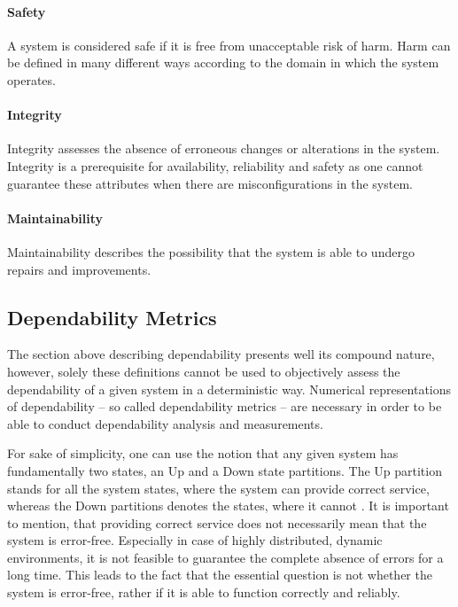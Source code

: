 \paragraph{Safety} A system is considered safe if it is free from unacceptable risk of harm. Harm can be defined in many different ways according to the domain in which the system operates.

\paragraph{Integrity} Integrity assesses the absence of erroneous changes or alterations in the system. Integrity is a prerequisite for availability, reliability and safety as one cannot guarantee these attributes when there are misconfigurations in the system.

\paragraph{Maintainability} Maintainability describes the possibility that the system is able to undergo repairs and improvements.


\subsection{Dependability Metrics}

The section above describing dependability presents well its compound nature, however, solely these definitions cannot be used to objectively assess the dependability of a given system in a deterministic way. Numerical representations of dependability -- so called dependability metrics -- are necessary in order to be able to conduct dependability analysis and measurements.

For sake of simplicity, one can use the notion that any given system has fundamentally two states, an Up and a Down state partitions. The Up partition stands for all the system states, where the system can provide correct service, whereas the Down partitions denotes the states, where it cannot \cite{DependabilityBMEMIT}. It is important to mention, that providing correct service does not necessarily mean that the system is error-free. Especially in case of highly distributed, dynamic environments, it is not feasible to guarantee the complete absence of errors for a long time. This leads to the fact that the essential question is not whether the system is error-free, rather if it is able to function correctly and reliably.

